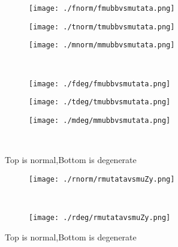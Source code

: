 \documentclass[aps,floats,floatfix,nofootinbib]{revtex4-1}
\begin{document}
\begin{center}
\begin{figure}
\begin{subfigure}{0.3\textwidth}
\texttt{[image: ./fnorm/fmubbvsmutata.png]}
\label{}
\end{subfigure}
\begin{subfigure}{0.3\textwidth}
\texttt{[image: ./tnorm/tmubbvsmutata.png]}
\label{}
\end{subfigure}
\begin{subfigure}{0.3\textwidth}
\texttt{[image: ./mnorm/mmubbvsmutata.png]}
\label{}
\end{subfigure}\\
\begin{subfigure}{0.3\textwidth}
\texttt{[image: ./fdeg/fmubbvsmutata.png]}
\label{}
\end{subfigure}
\begin{subfigure}{0.3\textwidth}
\texttt{[image: ./tdeg/tmubbvsmutata.png]}
\label{}
\end{subfigure}
\begin{subfigure}{0.3\textwidth}
\texttt{[image: ./mdeg/mmubbvsmutata.png]}
\label{}
\end{subfigure}\\
\caption{Top is normal,Bottom is degenerate}
\end{figure}
\end{center}

\begin{center}
\begin{figure}
\begin{subfigure}{1.0\textwidth}
\texttt{[image: ./rnorm/rmutatavsmuZy.png]}
\label{}
\end{subfigure}\\
\begin{subfigure}{1.0\textwidth}
\texttt{[image: ./rdeg/rmutatavsmuZy.png]}
\label{}
\end{subfigure}
\caption{Top is normal,Bottom is degenerate}
\end{figure}
\end{center}
\end{document}
